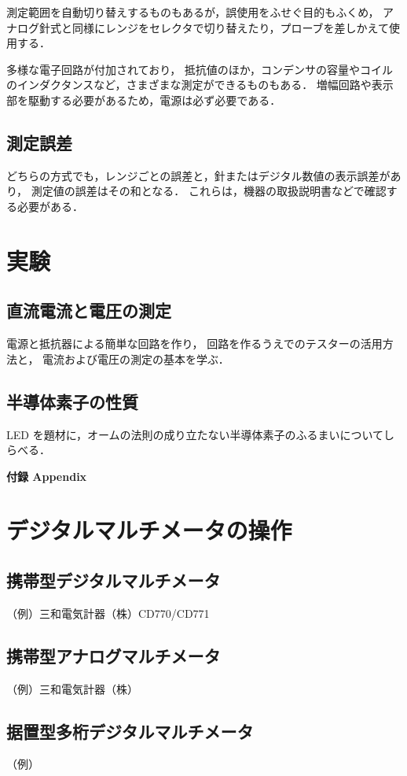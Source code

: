 \documentclass[11pt,sort]{jarticle}
\begin{document}
測定範囲を自動切り替えするものもあるが，誤使用をふせぐ目的もふくめ，
アナログ針式と同様にレンジをセレクタで切り替えたり，プローブを差しかえて使用する．

多様な電子回路が付加されており，
抵抗値のほか，コンデンサの容量やコイルのインダクタンスなど，さまざまな測定ができるものもある．
増幅回路や表示部を駆動する必要があるため，電源は必ず必要である．

\subsection{測定誤差}

どちらの方式でも，レンジごとの誤差と，針またはデジタル数値の表示誤差があり，
測定値の誤差はその和となる．
これらは，機器の取扱説明書などで確認する必要がある．


\section{実験}

\subsection{直流電流と電圧の測定}\label{a}

電源と抵抗器による簡単な回路を作り，
回路を作るうえでのテスターの活用方法と，
電流および電圧の測定の基本を学ぶ．

\subsection{半導体素子の性質}\label{b}

LED を題材に，オームの法則の成り立たない半導体素子のふるまいについてしらべる．





\newpage
\appendix
\noindent
{\LARGE\bf 付録 Appendix}

\section{デジタルマルチメータの操作}

\subsection{携帯型デジタルマルチメータ}
（例）三和電気計器（株）CD770/CD771

\subsection{携帯型アナログマルチメータ}
（例）三和電気計器（株）

\subsection{据置型多桁デジタルマルチメータ}
（例）
\end{document}
